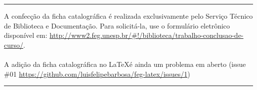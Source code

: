 \documentclass[
  12pt,		%
  a4paper,	%
  openright,%
  oneside,	%
  chapter=TITLE,		%
  section=TITLE,		%
  english,	%
  french,	%
  spanish,	%
  brazil
]{abntex2}
\newcommand{\nomeDoAutor}{
    Nome Completo do Autor
    }
\newcommand{\tituloDoTrabalho}{Título do trabalho somente com a primeira palavra em maiúsculo}
\newcommand{\subtituloDoTrabalho}{subtítulo do trabalho, se houver, todo em minúsculo}
\newcommand{\mesDeEntrega}{Fevereiro}
\newcommand{\anoDeEntrega}{2019}
\newcommand{\nomeDoOrientador}{
    Nome Completo do Orientador
    }
\newcommand{\tituloDoOrientador}{
    Profº Dr.
    }
\newcommand{\nomeDaUniversidade}{
    Universidade Estadual Paulista "Júlio de Mesquita Filho"
    }
\newcommand{\nomeDaCidade}{
    Guaratinguetá
    }
\begin{document}
    
    \imprimircapa
    \imprimirfolhaderosto
    
    \begin{fichacatalografica}
        \vspace*{15cm} %
        \hrule %
        \begin{center} %
        \begin{minipage}[c]{12.5cm} %
        A confecção da ficha catalográfica é realizada exclusivamente pelo Serviço Técnico de Biblioteca e Documentação. Para solicitá-la, use o formulário eletrônico disponível em: \url{http://www2.feg.unesp.br/#!/biblioteca/trabalho-conclusao-de-curso/}.
        \\
        \\
    
         A adição da ficha catalográfica no \LaTeX é ainda um problema em aberto (issue $\#$01 \url{https://github.com/luisfelipebarbosa/feg-latex/issues/1})
        
        \end{minipage}
        \end{center}
        \hrule
    \end{fichacatalografica}
    
\end{document}
